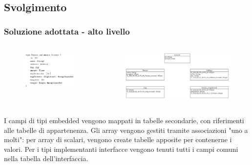 \documentclass[c]{beamer}
\begin{document}
        \subsection{Svolgimento}
            \begin{frame}
                \frametitle{Soluzione adottata - alto livello}
                \begin{columns}
                    \begin{figure}
                        \includegraphics[scale=0.28]{Tipo_difficile.png}
                    \end{figure}
                    \begin{figure}
                        \includegraphics[scale=0.24]{../db-example.jpg}
                    \end{figure}
                \end{columns}
                I campi di tipi embedded vengono mappati in tabelle secondarie, con riferimenti alle tabelle di appartenenza. Gli array vengono gestiti tramite associazioni "uno a molti": per array di scalari, vengono create tabelle apposite per contenerne i valori.
                \vfill
                Per i tipi implementanti interfacce vengono tenuti tutti i campi comuni nella tabella dell'interfaccia. 
            \end{frame}
\end{document}
